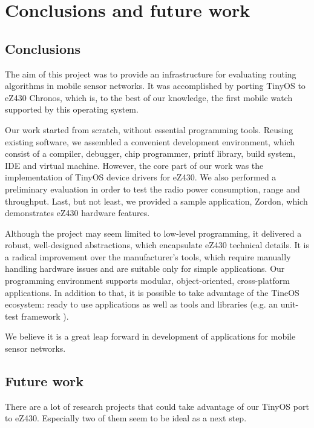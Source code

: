 \chapter{Conclusions and future work}
\label{ch:conclusions}

\section{Conclusions}


The aim of this project was to provide an infrastructure for evaluating routing algorithms in mobile sensor networks.
It was accomplished by porting TinyOS to eZ430 Chronos, which is, to the best of our knowledge, the first mobile watch supported by this operating system.

Our work started from scratch, without essential programming tools.
Reusing existing software, we assembled a convenient development environment, which consist of a compiler, debugger, chip programmer, printf library, build system, IDE and virtual machine.
However, the core part of our work was the implementation of TinyOS device drivers for eZ430.
We also performed a preliminary evaluation in order to test the radio power consumption, range and throughput.
Last, but not least, we provided a sample application, Zordon, which demonstrates eZ430 hardware features.

Although the project may seem limited to low-level programming, it delivered a robust, well-designed abstractions, which encapsulate eZ430 technical details.
It is a radical improvement over the manufacturer's tools, which require manually handling hardware issues and are suitable only for simple applications.
Our programming environment supports modular, object-oriented, cross-platform applications.
In addition to that, it is possible to take advantage of the TineOS ecosystem:
ready to use applications as well as tools and libraries (e.g. an unit-test framework \cite{TOSMock}).

We believe it is a great leap forward in development of applications for mobile sensor networks.


\section{Future work}
There are a lot of research projects that could take advantage of our TinyOS port to eZ430.
Especially two of them seem to be ideal as a next step.

